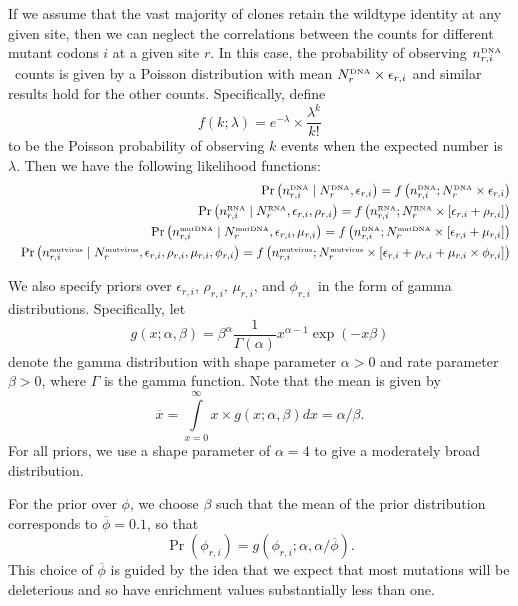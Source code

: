\documentclass[10pt]{article}
\newcommand{\Nrdna}{\mbox{$N_r^{\rm \scriptscriptstyle DNA}$}}
\newcommand{\Nrmutdna}{\mbox{$N_r^{\rm \scriptscriptstyle mut DNA}$}}
\newcommand{\Nrrna}{\mbox{$N_r^{\rm \scriptscriptstyle RNA}$}}
\newcommand{\Nrmutvirus}{\mbox{$N_r^{\rm \scriptscriptstyle mut virus}$}}
\newcommand{\nrdnai}{\mbox{$n_{r, i}^{\rm \scriptscriptstyle DNA}$}}
\newcommand{\nrmutdnai}{\mbox{$n_{r, i}^{\rm \scriptscriptstyle mut DNA}$}}
\newcommand{\nrrnai}{\mbox{$n_{r, i}^{\rm \scriptscriptstyle  RNA}$}}
\newcommand{\nrmutvirusi}{\mbox{$n_{r, i}^{\rm \scriptscriptstyle mut virus}$}}
\newcommand{\eri}{\mbox{$\epsilon_{r,i}$}}
\newcommand{\sri}{\mbox{$\phi_{r,i}$}}
\newcommand{\rri}{\mbox{$\rho_{r,i}$}}
\newcommand{\mri}{\mbox{$\mu_{r,i}$}}
\begin{document}
If we assume that the vast majority of clones retain the wildtype identity at any given site, then we can neglect the correlations between the counts for different mutant codons $i$ at a given site $r$. In this case, the probability of observing \nrdnai\ counts is given by a Poisson distribution with mean $\Nrdna \times \eri$ and similar results hold for the other counts. Specifically, define
\begin{equation}
f\left(k; \lambda\right) = e^{-\lambda}\times \frac{\lambda^k}{k!}
\end{equation}
to be the Poisson probability of observing $k$ events when the expected number is $\lambda$. Then we have the following likelihood functions:
\begin{eqnarray}
&& \Pr\left(\nrdnai \mid \Nrdna, \eri\right) = f\left(\nrdnai; \Nrdna \times \eri\right) \label{eq:likelihoodnrdnai} \\
&& \Pr\left(\nrrnai \mid \Nrrna, \eri, \rri\right) = f\left(\nrrnai; \Nrrna \times \left[\eri + \rri\right]\right) \label{eq:likelihoodnrrnai} \\
&& \Pr\left(\nrmutdnai \mid \Nrmutdna, \eri, \mri\right) = f\left(\nrdnai; \Nrmutdna \times \left[\eri + \mri\right]\right) \label{eq:likelihoodnrmutdnai} \\
&& \Pr\left(\nrmutvirusi \mid \Nrmutvirus, \eri, \rri, \mri, \sri\right) = f\left(\nrmutvirusi; \Nrmutvirus \times \left[\eri + \rri + \mri \times \sri\right]\right) \label{eq:likelihoodnrmutvirus} 
\end{eqnarray}

We also specify priors over \eri, \rri, \mri, and \sri\ in the form of gamma distributions. Specifically, let
\begin{equation}
\label{eq:gammadist}
g\left(x; \alpha, \beta\right) = \beta^\alpha \frac{1}{\Gamma\left(\alpha\right)}x^{\alpha - 1} \exp\left(-x\beta\right)
\end{equation}
denote the gamma distribution with shape parameter $\alpha > 0$ and rate parameter $\beta > 0$, where $\Gamma$ is the gamma function. Note that the mean is given by
\begin{equation}
\overline{x} = \int\limits_{x=0}^{\infty} x \times g\left(x; \alpha, \beta\right) dx = \alpha / \beta.
\end{equation}
For all priors, we use a shape parameter of $\alpha = 4$ to give a moderately broad distribution. 

For the prior over $\phi$, we choose $\beta$ such that the mean of the prior distribution corresponds to $\overline{\phi} = 0.1$, so that
\begin{equation}
\Pr\left(\sri\right) = g\left(\sri; \alpha, \alpha / \overline{\phi}\right).
\end{equation}
This choice of $\overline{\phi}$ is guided by the idea that we expect that most mutations will be deleterious and so have enrichment values substantially less than one.
\end{document}
